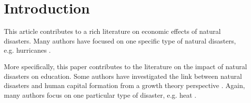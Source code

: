 
\section{Introduction}


This article contributes to a rich literature on economic effects of natural disasters. Many authors have focused on one specific type of natural disasters, e.g. hurricanes \citep{Deryugina_2017, Deryugina_2018}. 

More specifically, this paper contributes to the literature on the impact of natural disasters on education. Some authors have investigated the link between natural disasters and human capital formation from a growth theory perspective \citep{Skidmore_2002, Cuaresma_2010}. Again, many authors focus on one particular type of disaster, e.g. heat \citep{Park_2020}.
